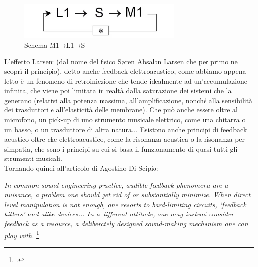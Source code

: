 \begin{figure}[h!]
    \begin{center}
        \vspace{0.5cm}
        \includegraphics[width=8cm]{figures/larsen_Feedback_scheme.png}
        \caption{Schema M1→L1→S}
        \vspace{0.5cm}
        \end{center}
\end{figure} 

L'effetto Larsen: (dal nome del fisico Søren Absalon Larsen
che per primo ne scoprì il principio), detto anche feedback elettroacustico,
come abbiamo appena letto è un fenomeno di retroiniezione che tende idealmente 
ad un'accumulazione infinita, che viene poi limitata in realtà dalla saturazione dei sistemi 
che la generano (relativi alla potenza massima, all'amplificazione, nonché alla sensibilità dei
trasduttori e all'elasticità delle membrane). Che può anche essere oltre al microfono, un
pick-up di uno strumento musicale elettrico, come una chitarra o un basso, o un trasduttore di
altra natura... 
Esistono anche principi di feedback acustico oltre che elettroacustico, 
come la risonanza acustica o la risonanza per simpatia,
che sono i principi su cui si basa il funzionamento di quasi tutti gli strumenti musicali. \\
Tornando quindi all'articolo di Agostino Di Scipio:

\begin{center}
\vspace{0.5cm}
\textit{In common sound engineering practice, audible feedback phenomena are a nuisance, a problem one
should get rid of or substantially minimize. When direct level manipulation is not enough, one
resorts to hard-limiting circuits, ‘feedback killers’ and alike devices... 
In a different attitude, one may instead consider feedback as
a resource, a deliberately designed sound-making mechanism one can play with.} \footcite{di_scipio_relational_2022}
\vspace{0.5cm}
\end{center}

